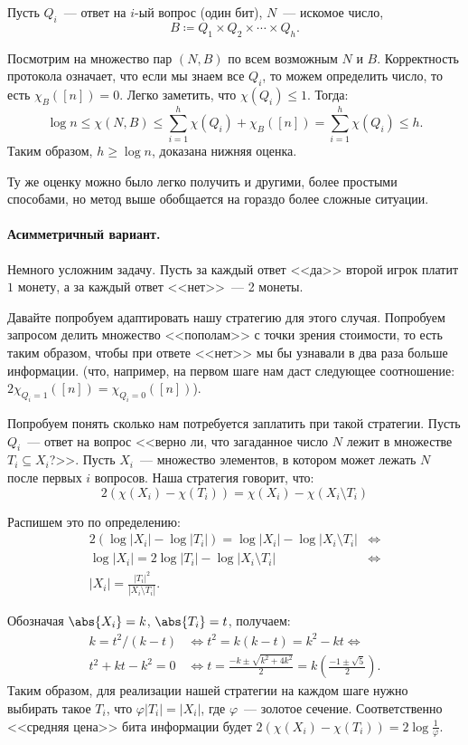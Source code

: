 Пусть $Q_i$~--- ответ на $i$-ый вопрос (один бит), $N$~--- искомое число,
$$
    B \coloneqq Q_1\times Q_2 \times \cdots \times Q_h.
$$ 

Посмотрим на множество пар $(N, B)$ по всем возможным $N$ и $B$. Корректность протокола означает, что
если мы знаем все $Q_i$, то можем определить число, то есть $\chi_{B}([n]) = 0$. Легко заметить, что
$\chi(Q_i) \leq 1$. Тогда:
$$
    \log{n} \leq \chi(N, B) \leq \sum_{i=1}^{h} \chi(Q_i) + \chi_B([n]) = \sum_{i=1}^{h} \chi(Q_i) \le
    h.
$$
Таким образом, $h \ge \log{n}$, доказана нижняя оценка.
	
Ту же оценку можно было легко получить и другими, более простыми способами, но метод выше обобщается на
гораздо более сложные ситуации.

\paragraph{Асимметричный вариант.}
Немного усложним задачу. Пусть за каждый ответ <<да>> второй игрок платит $1$ монету, а за каждый ответ
<<нет>>~--- 2 монеты.

Давайте попробуем адаптировать нашу стратегию для этого случая. Попробуем запросом делить множество
<<пополам>> с точки зрения стоимости, то есть таким образом, чтобы при ответе <<нет>> мы бы узнавали в
два раза больше информации. (что, например, на первом шаге нам даст следующее соотношение:
$2 \chi_{Q_i = 1}([n]) = \chi_{Q_i = 0}([n])$).

Попробуем понять сколько нам потребуется заплатить при такой стратегии. Пусть $Q_i$~--- ответ на вопрос
<<верно ли, что загаданное число $N$ лежит в множестве $T_i \subseteq X_i$?>>. Пусть $X_i$~--- множество
элементов, в котором может лежать $N$ после первых $i$ вопросов. Наша стратегия говорит, что:
$$
    2 (\chi(X_i) - \chi(T_i)) = \chi(X_i) - \chi(X_i \setminus T_i)
$$

Распишем это по определению:
\begin{align*}
  2(\log|X_i| - \log |T_i|) = \log|X_i| - \log|X_i \setminus T_i| &\iff\\
  \log |X_i| = 2 \log |T_i| - \log |X_i \setminus T_i| &\iff\\
  |X_i| = \frac{|T_i|^2}{|X_i\setminus T_i|}.
\end{align*}

Обозначая $\abs{X_i} = k$, $\abs{T_i} = t$, получаем:
\begin{align*}
	k = t^2 / (k - t) &\iff t^2 = k(k - t) = k^2 - kt \iff\\
	t^2 + kt - k^2 = 0 &\iff t = \frac{-k \pm \sqrt{k^2 + 4k^2}}{2} = k\left(\frac{-1 \pm \sqrt{5}}{2} \right).
\end{align*}
Таким образом, для реализации нашей стратегии на каждом шаге нужно выбирать такое $T_i$, что $\varphi
|T_i| = |X_i|$, где $\varphi$~--- золотое сечение. Соответственно <<средняя цена>> бита информации будет
$2(\chi(X_i) - \chi(T_i)) = 2 \log \frac{1}{\varphi}$.

